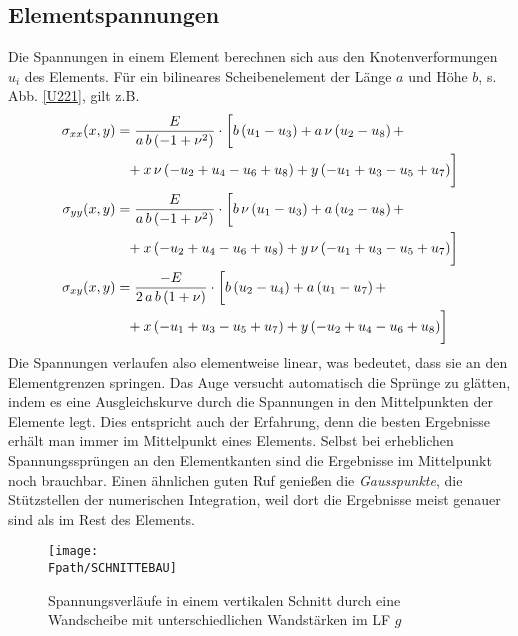 {%
{\textcolor{sectionTitleBlue}{\section{Elementspannungen}}}\label{Elementspannungen}
Die Spannungen in einem Element berechnen sich aus den Knotenverformungen $u_i$ des Elements. F\"{u}r ein
bilineares Scheibenelement der L\"{a}nge $a$ und H\"{o}he $b$, s. Abb. \ref{U221}, gilt z.B.
\allowdisplaybreaks
\begin{align}\label{SigBilinear}
\sigma_{xx}(x,y)&=\frac{E}{a\,
     b\,( -1 + \nu^2) }\cdot \bigg[
     b\,( {u_1} - {u_3}
          )  + a\,\nu\,
        ( {u_2} - {u_8} )\,+\nonumber\\&\hphantom{=}
        + x\, \nu\,(-u_2+u_4 -u_6 +u_8) +y\,(-u_1 + u_3 -u_5+ u_7)\bigg]\\
\sigma_{yy}(x,y)&=\frac{E}{a\,b\,
     ( -1 + \nu^2)}\cdot \bigg[
      b\,\nu\,
        ( {u_1} - {u_3} )  +
       a\,( {u_2} - {u_8} )\,+\nonumber \\&\hphantom{=}
        +x\,(-u_2 + u_4-u_6+ u_8) +y\,\nu\,(-u_1+u_3-u_5+u_7)  \bigg]\\
\sigma_{xy}(x,y)&=\frac{- E}{2\,a\,b\,
     ( 1 + \nu )}\cdot \bigg[
        b\,( {u_2} - {u_4}
             )  + a\,
          ( {u_1} - {u_7} )\,+ \nonumber \\&\hphantom{=}
        +x\,(-u_1 +u_3-u_5+ u_7)+ y\,(-u_2+ u_4-u_6+ u_8) \bigg]
\end{align}
Die Spannungen verlaufen also elementweise linear, was bedeutet, dass sie an den Elementgrenzen springen. Das Auge versucht automatisch die Spr\"{u}nge zu gl\"{a}tten, indem es eine Ausgleichskurve durch die Spannungen in den Mittelpunkten der Elemente legt. Dies entspricht auch der Erfahrung, denn die besten Ergebnisse erh\"{a}lt man immer im Mittelpunkt eines Elements. Selbst bei erheblichen Spannungsspr\"{u}ngen an den Elementkanten sind die Ergebnisse im Mittelpunkt noch brauchbar. Einen \"{a}hnlichen guten Ruf genie{\ss}en die {\em Gausspunkte\/}, die St\"{u}tzstellen der numerischen Integration, weil dort die Ergebnisse meist genauer sind als im Rest des Elements.
\begin{figure}[tbp] \centering
\if {} \sidecaption \fi
\texttt{[image: \\Fpath/SCHNITTEBAU]}
\caption{Spannungsverl\"{a}ufe in einem vertikalen Schnitt durch eine Wandscheibe mit
unterschiedlichen Wandst\"{a}rken im LF $g$} \label{SchnitteBau}
\end{figure}%

}
